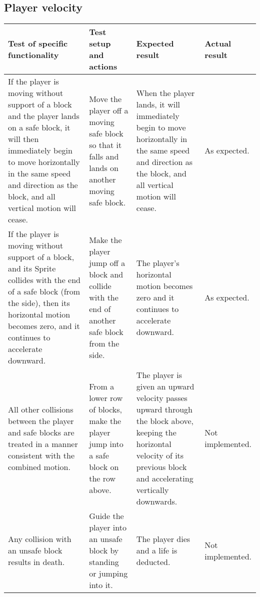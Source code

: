 \documentclass[10pt, titlepage]{article}
\newenvironment{testplan}[1]
{
\newcommand{\test}[4]{\midrule ##1 & ##2 & ##3 & ##4 \\}
\subsection{#1}
\begin{longtable}{L{0.3\textwidth}L{0.2\textwidth}L{0.25\textwidth}L{0.15\textwidth}}
\toprule
\textbf{Test of specific functionality} & \textbf{Test setup and actions} & \textbf{Expected result} & \textbf{Actual result} \\
}
{
\bottomrule
\end{longtable}
}
\begin{document}
\begin{testplan}{Player velocity}
\test{If the player is moving without support of a block and the player lands on a safe block, it will then immediately begin to move horizontally in the same speed and direction as the block, and all vertical motion will cease.}{Move the player off a moving safe block so that it falls and lands on another moving safe block.}{When the player lands, it will immediately begin to move horizontally in the same speed and direction as the block, and all vertical motion will cease.}{As expected.}
\test{If the player is moving without support of a block, and its Sprite collides with the end of a safe block (from the side), then its horizontal motion becomes zero, and it continues to accelerate downward.}{Make the player jump off a block and collide with the end of another safe block from the side.}{The player's horizontal motion becomes zero and it continues to accelerate downward.}{As expected.}
\test{All other collisions between the player and safe blocks are treated in a manner consistent with the combined motion.}{From a lower row of blocks, make the player jump into a safe block on the row above.}{The player is given an upward velocity passes upward through the block above, keeping the horizontal velocity of its previous block and accelerating vertically downwards.}{Not implemented.}
\test{Any collision with an unsafe block results in death.}{Guide the player into an unsafe block by standing or jumping into it.}{The player dies and a life is deducted.}{Not implemented.}
\end{testplan}
\end{document}
